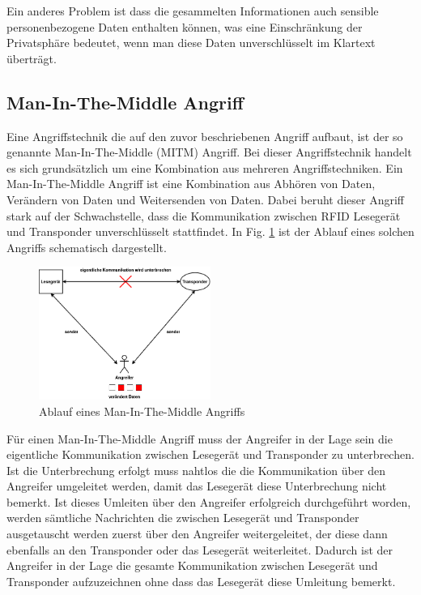 \documentclass[conference]{IEEEtran}
\begin{document}
Ein anderes Problem ist dass die gesammelten Informationen auch sensible personenbezogene Daten enthalten können, was eine Einschränkung der Privatsphäre bedeutet, wenn man diese Daten unverschlüsselt im Klartext überträgt.

\subsection{Man-In-The-Middle Angriff}
Eine Angriffstechnik die auf den zuvor beschriebenen Angriff aufbaut, ist der so genannte Man-In-The-Middle (MITM) Angriff. Bei dieser Angriffstechnik handelt es sich grundsätzlich um eine Kombination aus mehreren Angriffstechniken. Ein Man-In-The-Middle Angriff ist eine Kombination aus Abhören von Daten, Verändern von Daten und Weitersenden von Daten. Dabei beruht dieser Angriff stark auf der Schwachstelle, dass die Kommunikation zwischen RFID Lesegerät und Transponder unverschlüsselt stattfindet. In Fig. \ref{fig3} ist der Ablauf eines solchen Angriffs schematisch dargestellt.

\begin{figure}[htbp]
\centerline{\includegraphics[width=0.5\textwidth]{img/MITM.png}}
\caption{Ablauf eines Man-In-The-Middle Angriffs}
\label{fig3}
\end{figure}

Für einen Man-In-The-Middle Angriff muss der Angreifer in der Lage sein die eigentliche Kommunikation zwischen Lesegerät und Transponder zu unterbrechen. Ist die Unterbrechung erfolgt muss nahtlos die die Kommunikation über den Angreifer umgeleitet werden, damit das Lesegerät diese Unterbrechung nicht bemerkt. Ist dieses Umleiten über den Angreifer erfolgreich durchgeführt worden, werden sämtliche Nachrichten die zwischen Lesegerät und Transponder ausgetauscht werden zuerst über den Angreifer weitergeleitet, der diese dann ebenfalls an den Transponder oder das Lesegerät weiterleitet. Dadurch ist der Angreifer in der Lage die gesamte Kommunikation zwischen Lesegerät und Transponder aufzuzeichnen ohne dass das Lesegerät diese Umleitung bemerkt.
\end{document}
